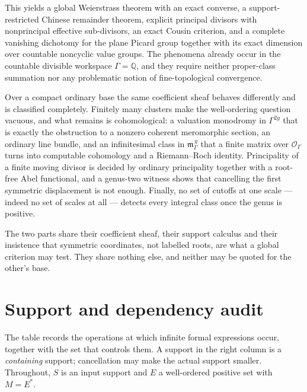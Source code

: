 \documentclass[11pt,letterpaper]{article}
\theoremstyle{definition}
\theoremstyle{remark}
\newcommand{\Q}{\mathbb Q}
\newcommand{\OO}{\mathcal O}
\newcommand{\mK}{\mathfrak m_\Gamma}
\numberwithin{equation}{section}
\begin{document}
This yields a global Weierstrass theorem with an exact converse, a support-restricted Chinese remainder theorem, explicit principal divisors with nonprincipal effective sub-divisors, an exact Cousin criterion, and a complete vanishing dichotomy for the plane Picard group together with its exact dimension over countable noncyclic value groups. The phenomena already occur in the countable divisible workspace $\Gamma=\Q$, and they require neither proper-class summation nor any problematic notion of fine-topological convergence.

Over a compact ordinary base the same coefficient sheaf behaves differently and is classified completely. Finitely many clusters make the well-ordering question vacuous, and what remains is cohomological: a valuation monodromy in $\Gamma^{2g}$ that is exactly the obstruction to a nonzero coherent meromorphic section, an ordinary line bundle, and an infinitesimal class in $\mK^{\,g}$ that a finite matrix over $\OO_\Gamma$ turns into computable cohomology and a Riemann--Roch identity. Principality of a finite moving divisor is decided by ordinary principality together with a root-free Abel functional, and a genus-two witness shows that cancelling the first symmetric displacement is not enough. Finally, no set of cutoffs at one scale --- indeed no set of scales at all --- detects every integral class once the genus is positive.

The two parts share their coefficient sheaf, their support calculus and their insistence that symmetric coordinates, not labelled roots, are what a global criterion may test. They share nothing else, and neither may be quoted for the other's base.

\appendix

\section{Support and dependency audit}\label{global:app:audit}

The table records the operations at which infinite formal expressions occur, together with the set that controls them. A support in the right column is a \emph{containing} support; cancellation may make the actual support smaller. Throughout, $S$ is an input support and $E$ a well-ordered positive set with $M=E^*$.
\end{document}
